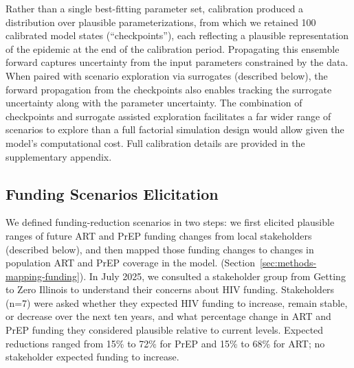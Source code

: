 \documentclass[preprint,12pt]{elsarticle}
\begin{document}
Rather than a single best-fitting parameter set, calibration produced a distribution over plausible parameterizations, from which we retained 100 calibrated model states (``checkpoints''), each reflecting a plausible representation of the epidemic at the end of the calibration period. Propagating this ensemble forward captures uncertainty from the input parameters constrained by the data. When paired with scenario exploration via surrogates (described below), the forward propagation from the checkpoints also enables tracking the surrogate uncertainty along with the parameter uncertainty. The combination of checkpoints and surrogate assisted exploration facilitates a far wider range of scenarios to explore than a full factorial simulation design would allow given the model's computational cost. Full calibration details are provided in the supplementary appendix.



\subsection{Funding Scenarios Elicitation}
\label{sec:methods-funding-scenarios}
We defined funding-reduction scenarios in two steps: we first elicited plausible ranges of future ART and PrEP funding changes from local stakeholders (described below), and then mapped those funding changes to changes in population ART and PrEP coverage in the model. (Section~\ref{sec:methods-mapping-funding}). In July 2025, we consulted a stakeholder group from Getting to Zero Illinois to understand their concerns about HIV funding. Stakeholders (n=7) were asked whether they expected HIV funding to increase, remain stable, or decrease over the next ten years, and what percentage change in ART and PrEP funding they considered plausible relative to current levels. Expected reductions ranged from 15\% to 72\% for PrEP and 15\% to 68\% for ART; no stakeholder expected funding to increase.
\end{document}
